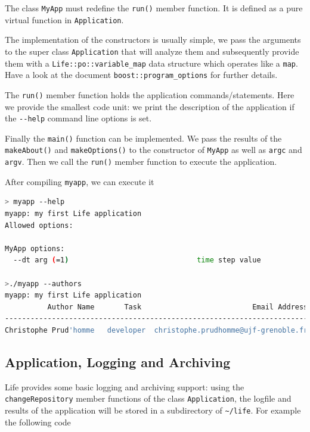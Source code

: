 \documentclass[a4paper]{book}
\begin{document}
The class \lstinline!MyApp! must redefine the \lstinline!run()! member
function. It is defined as a pure virtual function in
\lstinline!Application!.




The implementation of the constructors is usually simple, we pass the
arguments to the super class \lstinline!Application! that will analyze
them and subsequently provide them with a
\lstinline!Life::po::variable_map! data structure which operates like
a \lstinline!map!. Have a look at the document
\lstinline!boost::program_options! for further details.



The \lstinline!run()! member function holds the application
commands/statements. Here we provide the smallest code unit: we print
the description of the application if the \lstinline!--help! command
line options is set.


Finally the \lstinline!main()! function can be implemented. We pass
the results of the \lstinline!makeAbout()! and
\lstinline!makeOptions()! to the constructor of \lstinline!MyApp! as
well as \lstinline!argc! and \lstinline!argv!. Then we call the
\lstinline!run()! member function to execute the application.



After compiling \lstinline!myapp!, we can execute it

\begin{lstlisting}[language=sh]
> myapp --help
myapp: my first Life application
Allowed options:

MyApp options:
  --dt arg (=1)                              time step value

>./myapp --authors
myapp: my first Life application
          Author Name       Task                          Email Address
-----------------------------------------------------------------------
Christophe Prud'homme   developer  christophe.prudhomme@ujf-grenoble.fr
\end{lstlisting}

\subsection{Application, Logging and Archiving}
\label{sec:appl-logg-arch}

Life provides some basic logging and archiving support: using the
\lstinline!changeRepository! member functions of the class
\lstinline!Application!, the logfile and results of the application
will be stored in a subdirectory of \lstinline!~/life!. For
example the following code
\end{document}

